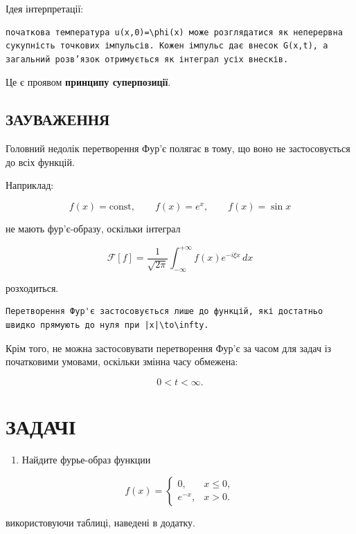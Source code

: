 \documentclass[
  ukrainian,
]{article}
\providecommand{\tightlist}{%
  \setlength{\itemsep}{0pt}\setlength{\parskip}{0pt}}
\begin{document}
Ідея інтерпретації:

\begin{verbatim}
початкова температура u(x,0)=\phi(x) може розглядатися як неперервна сукупність точкових імпульсів. Кожен імпульс дає внесок G(x,t), а загальний розв’язок отримується як інтеграл усіх внесків.
\end{verbatim}

Це є проявом \textbf{принципу суперпозиції}.

\subsection{ЗАУВАЖЕННЯ}\label{ux437ux430ux443ux432ux430ux436ux435ux43dux43dux44f-7}

Головний недолік перетворення Фур'є полягає в тому, що воно не
застосовується до всіх функцій.

Наприклад:

\[
f(x)=\text{const}, \qquad f(x)=e^x, \qquad f(x)=\sin x
\]

не мають фур'є-образу, оскільки інтеграл

\[
\mathcal{F}[f] = \frac{1}{\sqrt{2\pi}} \int_{-\infty}^{+\infty} f(x)e^{-i\xi x}\,dx
\]

розходиться.

\begin{verbatim}
Перетворення Фур'є застосовується лише до функцій, які достатньо швидко прямують до нуля при |x|\to\infty.
\end{verbatim}

Крім того, не можна застосовувати перетворення Фур'є за часом для задач
із початковими умовами, оскільки змінна часу обмежена:

\[
0 < t < \infty.
\]

\section{ЗАДАЧІ}\label{ux437ux430ux434ux430ux447ux456-1}

\begin{enumerate}
\def\labelenumi{\arabic{enumi}.}
\tightlist
\item
  Найдите фурье-образ функции
\end{enumerate}

\[
f(x)=
\begin{cases}
0, & x \le 0, \\
e^{-x}, & x > 0.
\end{cases}
\]

використовуючи таблиці, наведені в додатку.
\end{document}

